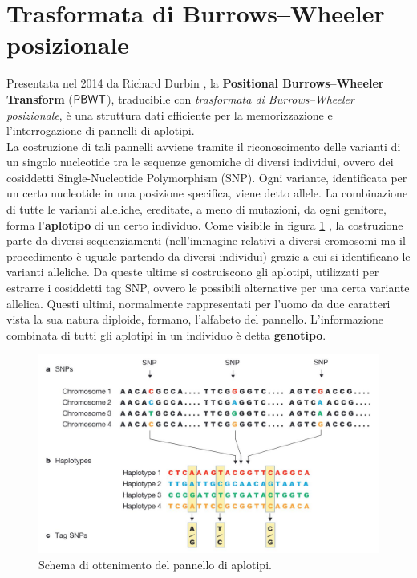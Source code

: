 \section{Trasformata di Burrows--Wheeler posizionale}
\label{secpbwt}
Presentata nel 2014 da Richard Durbin \cite{pbwt}, la \textbf{Positional
  Burrows--Wheeler Transform} ($\mbox{\rm {\sf PBWT}}$), traducibile con
\textit{trasformata di Burrows--Wheeler posizionale}, è una struttura dati
efficiente
per la memorizzazione e l'interrogazione di pannelli di aplotipi.\\
La costruzione di tali pannelli avviene tramite il riconoscimento delle
varianti di un singolo nucleotide tra le sequenze genomiche di diversi
individui, ovvero dei cosiddetti Single-Nucleotide Polymorphism
(SNP). Ogni variante, identificata per un certo nucleotide in una
posizione specifica, viene 
detto allele. La combinazione di tutte le varianti alleliche,
ereditate, a meno di mutazioni, da ogni genitore, forma l'\textbf{aplotipo} di
un certo individuo. Come visibile in figura \ref{fig:haplo} \cite{haplo}, la 
costruzione parte da diversi sequenziamenti (nell'immagine relativi a diversi
cromosomi ma il
procedimento è uguale partendo da diversi individui) grazie a cui si
identificano le 
varianti alleliche. Da queste ultime si costruiscono gli aplotipi, utilizzati
per estrarre i cosiddetti tag SNP, ovvero le possibili alternative per
una certa variante allelica. Questi ultimi, normalmente rappresentati per
l'uomo da due caratteri vista la sua natura diploide, formano,
l'alfabeto del pannello. 
L’informazione combinata di tutti gli aplotipi in un individuo è detta
\textbf{genotipo}.
\begin{figure}
  \centering
  \includegraphics[scale = 0.25]{img/haplo.jpg}
  \vspace{-5mm}
  \caption{Schema di ottenimento del pannello di aplotipi.}
  \label{fig:haplo}
\end{figure}
